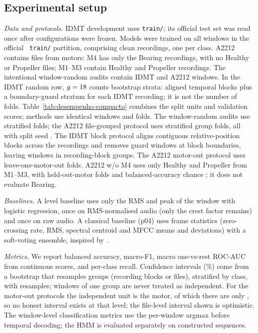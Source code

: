 \documentclass[conference]{IEEEtran}
\begin{document}
\subsection{Experimental setup}
\label{sec:setup}

\emph{Data and protocols.} IDMT development uses \texttt{train/}; its official test set was read
once after configurations were frozen. Models were trained on all windows in the official
~\texttt{train/} partition, comprising \VDataIdmtRecordings{} clean recordings, one per class.
A2212
contains \VDataBldcRecordings{} files from \VDataBldcMotors{} motors: M4 has only the
\VDataBldcFilesBearing{} Bearing recordings, with no Healthy or Propeller files; M1--M3 contain
\VDataBldcFilesHealthy{} Healthy and \VDataBldcFilesPropeller{} Propeller recordings. The
intentional window-random audits contain \VDataIdmtWindows{} IDMT and \VDataBldcWindows{}
A2212 windows. In the IDMT random row, $g=18{}$ counts bootstrap strata:
\VDataIdmtBlockCount{} aligned temporal blocks plus a boundary-guard stratum for each IDMT
recording; it is not the number of folds.
Table~\ref{tab:desempenho-compacto} combines the split units and validation scores; methods use
identical windows and folds. The window-random audits use \VDataRandomFolds{} stratified folds;
the A2212 file-grouped protocol uses \VDataBldcFileFolds{} stratified group folds, all with split
seed \VDataSeedSplit{}. The IDMT block protocol aligns \VDataIdmtBlockCount{} contiguous
relative-position blocks across the \VDataIdmtRecordings{} recordings and removes guard windows at
block boundaries, leaving \VDataIdmtBlockWindows{} windows in \VDataIdmtBlkGroups{}
recording-block groups. The A2212 motor-out protocol uses \VDataBldcMotorFolds{}
leave-one-motor-out folds. A2212 w/o M4 uses only Healthy and Propeller from M1--M3, with
\VDataBldcNoMfourFolds{} held-out-motor folds and balanced-accuracy chance
\VDataBldcNoMfourChanceBA{}; it does not evaluate Bearing.

\emph{Baselines.} A level baseline uses only the RMS and peak of the window with logistic
regression, once on RMS-normalised audio (only the crest factor remains) and once on raw audio. A
classical baseline (p04) uses \VParNClassicFeat{} frame statistics (zero-crossing rate, RMS,
spectral centroid and MFCC means and deviations) with a soft-voting ensemble, inspired
by~\cite{vanaraj2026}.

\emph{Metrics.} We report balanced accuracy, macro-F1, macro one-vs-rest ROC-AUC from continuous
scores, and per-class recall. Confidence intervals (\VDataCiLevel{}\%) come from a bootstrap that
resamples groups (recording blocks or files), stratified by class, with \VDataNBoot{} resamples;
windows of one group are never treated as independent. For the motor-out protocols the
independent unit is the motor, of which there are only \VDataBldcMotors{}, so no honest interval
exists at that level; the file-level interval shown is optimistic. The window-level classification
metrics use the per-window argmax before temporal decoding; the HMM is evaluated separately on
constructed sequences.
\end{document}

